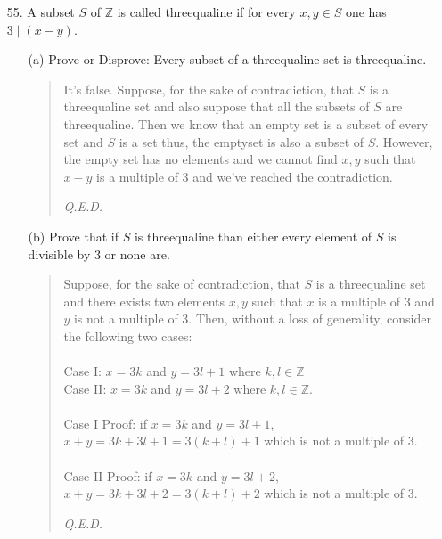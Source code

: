 \documentclass[12pt, a4paper]{article}                      %
\begin{document}
\begin{itemize}
\item[55.]
A subset $S$ of $\mathbb{Z}$ is called threequaline if for every $x, y \in S$ one has $3 \mid (x - y)$.
\begin{itemize}
\item[(a)]
Prove or Disprove: Every subset of a threequaline set is threequaline.
\begin{quote}
It's false. Suppose, for the sake of contradiction, that $S$ is a threequaline set and also suppose that all the subsets of $S$ are threequaline.
Then we know that an empty set is a subset of every set and $S$ is a set thus, the emptyset is also a subset of $S$.
However, the empty set has no elements and we cannot find $x, y$ such that $x - y$ is a multiple of 3 and we've reached the contradiction.
\begin{flushright}
\textit{Q.E.D.}
\end{flushright}
\end{quote}

\item[]

\item[(b)]
Prove that if $S$ is threequaline than either every element of $S$ is divisible by 3 or none are.
\begin{quote}
Suppose, for the sake of contradiction, that $S$ is a threequaline set and there exists two elements
$x, y$ such that $x$ is a multiple of 3 and $y$ is not a multiple of 3.
Then, without a loss of generality, consider the following two cases:\\\\
Case I: $x = 3k$ and $y = 3l + 1$ where $k,l \in \mathbb{Z}$\\
Case II: $x = 3k$ and $y = 3l + 2$ where $k,l \in \mathbb{Z}$.\\\\
Case I Proof: if $x = 3k$ and $y = 3l + 1$, $x + y = 3k + 3l + 1 = 3(k + l) + 1$ which is not a multiple of 3.\\\\
Case II Proof: if $x = 3k$ and $y = 3l + 2$, $x + y = 3k + 3l + 2 = 3(k + l) + 2$ which is not a multiple of 3.
\begin{flushright}
\textit{Q.E.D.}
\end{flushright}
\end{quote}

\item[]


\end{itemize}
\end{itemize}
\end{document}
